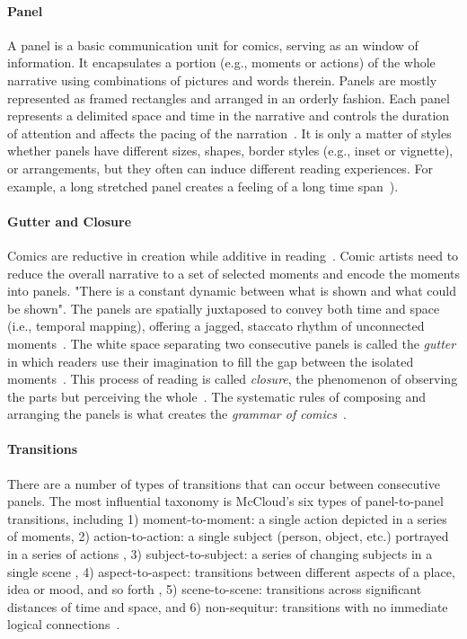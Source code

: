 \paragraph{Panel}

A panel is a basic communication unit for comics, serving as an window of information. It encapsulates a portion (e.g., moments or actions) of the whole narrative using combinations of pictures and words therein. Panels are mostly represented as framed rectangles and arranged in an orderly fashion. Each panel represents a delimited space and time in the narrative and controls the duration of attention and affects the pacing of the narration~\cite{caldwell2012comic,duncan2000toward,duncan2015power}. It is only a matter of styles whether panels have different sizes, shapes, border styles (e.g., inset or vignette), or arrangements, but they often can induce different reading experiences. For example, a long stretched panel creates a feeling of a long time span~\cite{eisner2008comics}). 

\paragraph{Gutter and Closure}


Comics are reductive in creation while additive in reading~\cite{duncan2000toward}. Comic artists need to reduce the overall narrative to a set of selected moments and encode the moments into panels. "There is a constant dynamic between what is shown and what could be shown". The panels are spatially juxtaposed to convey both time and space (i.e., temporal mapping), offering a jagged, staccato rhythm of unconnected moments~\cite{mccloud1993understanding}. The white space separating two consecutive panels is called the \textit{gutter} in which readers use their imagination to fill the gap between the isolated moments~\cite{mccloud1993understanding}. This process of reading is called \textit{closure}, the phenomenon of observing the parts but perceiving the whole~\cite{mccloud1993understanding,duncan2015power}. The systematic rules of composing and arranging the panels is what creates the \textit{grammar of comics}~\cite{eisner2008comics}. 

\paragraph{Transitions}

There are a number of types of transitions that can occur between consecutive panels. The most influential taxonomy is McCloud's six types of panel-to-panel transitions, including 1) moment-to-moment: a single action depicted in a series of moments, 2) action-to-action: a single subject (person, object, etc.) portrayed in a series of actions , 3) subject-to-subject: a series of changing subjects in a single scene , 4) aspect-to-aspect: transitions between different aspects of a place, idea or mood, and so forth , 5) scene-to-scene: transitions across significant distances of time and space, and 6) non-sequitur: transitions with no immediate logical connections~\cite{mccloud2011making,mccloud1993understanding}. 

